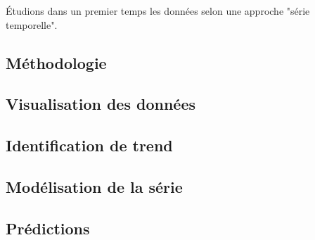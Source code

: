 \documentclass[../report.tex]{subfiles}
\begin{document}
\par Étudions dans un premier temps les données selon une approche "série temporelle".

\subsection{Méthodologie}

\subsection{Visualisation des données}

\subsection{Identification de trend}

\subsection{Modélisation de la série}

\subsection{Prédictions}
\end{document}
